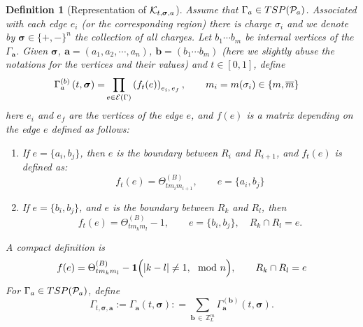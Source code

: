 \documentclass[10pt,reqno]{article}
\renewcommand{\bar}{\overline}
\theoremstyle{plain} %
\newtheorem{definition}[theorem]{Definition}
\theoremstyle{remark}
\numberwithin{equation}{section}
\begin{document}
\begin{definition}[Representation of ${\cal K}_{t, \boldsymbol{\sigma}, \textbf{a}}$]\label{def33} 
Assume that  $\Gamma_{\textbf{a}}\in TSP({\cal P}_{\textbf{a}})$. 
Associated with each edge $e_i$ (or the corresponding region) there is charge $\sigma_i$ and we denote by  $\boldsymbol{\sigma}\in \{+,-\}^n$ the collection of all charges. 
Let $b_1\cdots b_m$ be internal vertices of the $\Gamma_{\textbf{a}}$. Given $\boldsymbol{\sigma}$, 
$ \textbf{a}=(a_1, a_2,\cdots, a_n)$,  $\textbf{b}=(b_1\cdots b_m)$  (here we slightly abuse the notations for the vertices and their  values) and 
$t\in[0,1]$, define 
\begin{align}\label{defGabst}
\Gamma_{\textbf{a}}^{(\textbf{b})}\left( t,\boldsymbol{\sigma}\right)=& 
\prod_{e\in {\cal E} (\Gamma)} \left(f_{ t}(e)\right)_{e_i,\,e_f},\quad \quad m_i=m(\sigma_i)\in \{m, \bar m \}
\end{align}
here $e_i$ and $e_f$ are the vertices of the edge $e$,  and $f(e)$ is a matrix depending on the edge $e$ defined as follows:  
\begin{enumerate}
    \item If $e=\{a_i, b_j\}$, %
    then $e$ is the boundary between $R_i$ and $R_{i+1}$, and $f_t(e)$ is defined as: 
    $$ 
    f_t(e)= \Theta^{(B)}_{t m_i m_{i+1}},\quad\quad  e=\{a_i, b_j\}
    $$
     \item If $e=\{b_i, b_j\}$, and $e$ is the boundary between   $R_k$ and $R_{l}$, then %
    $$ 
    f_t(e)= \Theta^{(B)}_{t m_k m_{l}}-1,\quad \quad e=\{b_i, b_j\},\quad R_k\cap R_l =e. 
    $$
\end{enumerate}
A compact definition is
\begin{equation}\label{def_feRR}
    f(e) =
 \Theta^{(B)}_{t m_k m_{l}}-{\bf 1}\Big(|k  - l|\ne 1,\mod n\Big),\quad  \quad R_k\cap R_l =e 
\end{equation}
For $\Gamma_{\textbf{a}}\in TSP({\cal P}_{\textbf{a}})$, define  %
\begin{equation}\label{def_Gatsiga}
   \Gamma_{t, \boldsymbol{\sigma}, \textbf{a}}
 :=
 \Gamma_{\textbf{a}}(t, \boldsymbol{\sigma})
 : = \sum_{\textbf{b}\,\in \,\mathbb Z_L^m} \Gamma^{(\textbf{b})}_{\textbf{a}}(t, \boldsymbol{\sigma}) .
\end{equation}
 
\end{definition}
\end{document}
